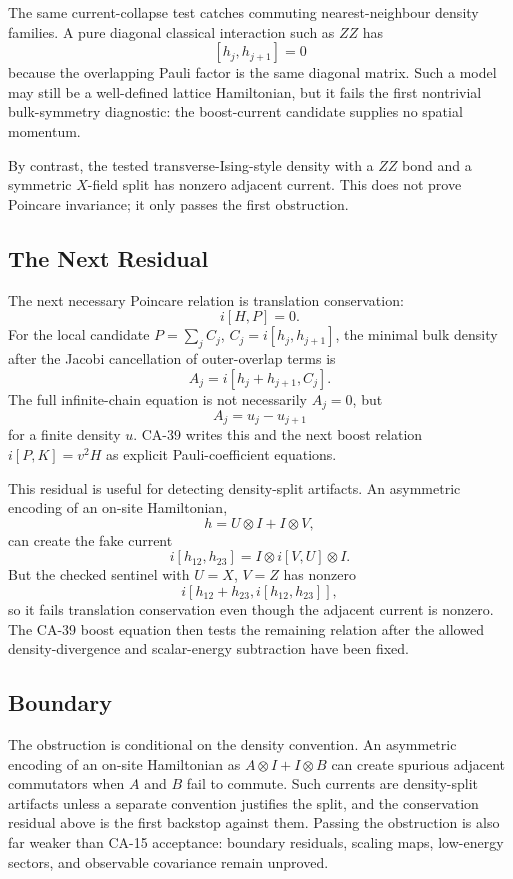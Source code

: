 The same current-collapse test catches commuting nearest-neighbour density
families.  A pure diagonal classical interaction such as \(ZZ\) has
\[
  [h_j,h_{j+1}]=0
\]
because the overlapping Pauli factor is the same diagonal matrix.  Such a model
may still be a well-defined lattice Hamiltonian, but it fails the first
nontrivial bulk-symmetry diagnostic: the boost-current candidate supplies no
spatial momentum.

By contrast, the tested transverse-Ising-style density with a \(ZZ\) bond and a
symmetric \(X\)-field split has nonzero adjacent current.  This does not prove
Poincare invariance; it only passes the first obstruction.

\subsection{The Next Residual}

The next necessary Poincare relation is translation conservation:
\[
  i[H,P]=0.
\]
For the local candidate \(P=\sum_j C_j\), \(C_j=i[h_j,h_{j+1}]\), the minimal
bulk density after the Jacobi cancellation of outer-overlap terms is
\[
  A_j=i[h_j+h_{j+1},C_j].
\]
The full infinite-chain equation is not necessarily \(A_j=0\), but
\[
  A_j=u_j-u_{j+1}
\]
for a finite density \(u\).  CA-39 writes this and the next boost relation
\(i[P,K]=v^2H\) as explicit Pauli-coefficient equations.

This residual is useful for detecting density-split artifacts.  An asymmetric
encoding of an on-site Hamiltonian,
\[
  h=U\otimes I+I\otimes V,
\]
can create the fake current
\[
  i[h_{12},h_{23}]=I\otimes i[V,U]\otimes I.
\]
But the checked sentinel with \(U=X\), \(V=Z\) has nonzero
\[
  i[h_{12}+h_{23},i[h_{12},h_{23}]],
\]
so it fails translation conservation even though the adjacent current is
nonzero.  The CA-39 boost equation then tests the remaining relation after the
allowed density-divergence and scalar-energy subtraction have been fixed.

\subsection{Boundary}

The obstruction is conditional on the density convention.  An asymmetric
encoding of an on-site Hamiltonian as \(A\otimes I+I\otimes B\) can create
spurious adjacent commutators when \(A\) and \(B\) fail to commute.  Such
currents are density-split artifacts unless a separate convention justifies the
split, and the conservation residual above is the first backstop against them.
Passing the obstruction is also far weaker than CA-15 acceptance: boundary
residuals, scaling maps, low-energy sectors, and observable covariance remain
unproved.
